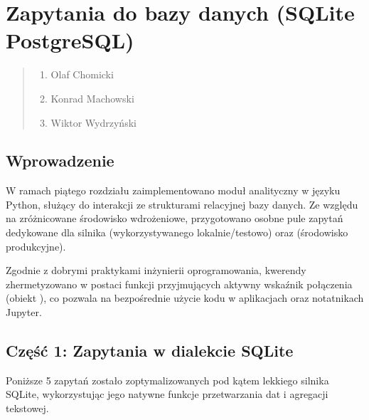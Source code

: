 \documentclass[a4paper,11pt,english,openany,oneside]{sphinxmanual}
\begin{document}
\chapter{Zapytania do bazy danych (SQLite PostgreSQL)}
\label{\detokenize{rozdzial_5/index:zapytania-do-bazy-danych-sqlite-postgresql}}\label{\detokenize{rozdzial_5/index::doc}}\begin{quote}\begin{description}
\begin{enumerate}
%
\item {} 
\sphinxAtStartPar
Olaf Chomicki

\item {} 
\sphinxAtStartPar
Konrad Machowski

\item {} 
\sphinxAtStartPar
Wiktor Wydrzyński

\end{enumerate}

\end{description}\end{quote}


\section{Wprowadzenie}
\label{\detokenize{rozdzial_5/index:wprowadzenie}}
\sphinxAtStartPar
W ramach piątego rozdziału zaimplementowano moduł analityczny w języku Python, służący do interakcji ze strukturami relacyjnej bazy danych. Ze względu na zróżnicowane środowisko wdrożeniowe, przygotowano osobne pule zapytań dedykowane dla silnika  (wykorzystywanego lokalnie/testowo) oraz  (środowisko produkcyjne).

\sphinxAtStartPar
Zgodnie z dobrymi praktykami inżynierii oprogramowania, kwerendy zhermetyzowano w postaci funkcji przyjmujących aktywny wskaźnik połączenia (obiekt ), co pozwala na bezpośrednie użycie kodu w aplikacjach oraz notatnikach Jupyter.


\section{Część 1: Zapytania w dialekcie SQLite}
\label{\detokenize{rozdzial_5/index:czesc-1-zapytania-w-dialekcie-sqlite}}
\sphinxAtStartPar
Poniższe 5 zapytań zostało zoptymalizowanych pod kątem lekkiego silnika SQLite, wykorzystując jego natywne funkcje przetwarzania dat i agregacji tekstowej.
\end{document}
